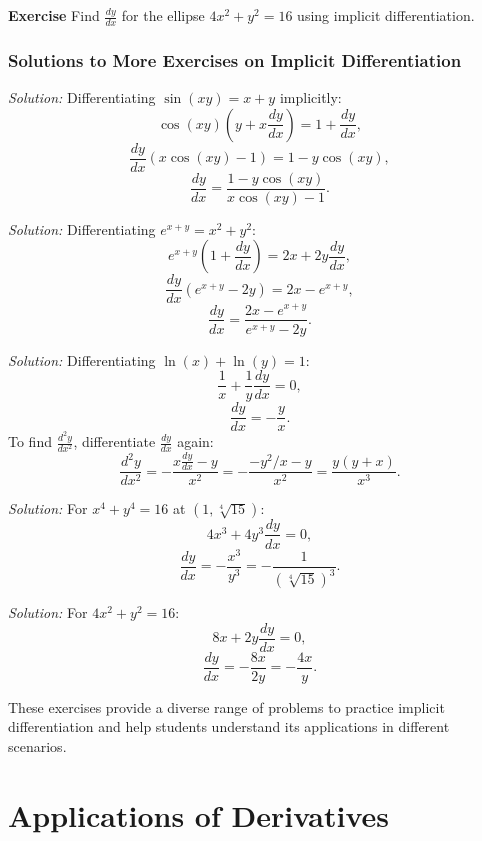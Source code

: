 \documentclass[a4paper,12pt]{book}
\newenvironment{exercise}[1][]
  {\par\medskip\noindent\textbf{Exercise #1} \rmfamily}
  {\medskip}
\newcounter{problem}
\newenvironment{solution}[1][]
{\par\noindent\textit{Solution:} \rmfamily}{\medskip}
\begin{document}
\begin{exercise}
Find \( \frac{dy}{dx} \) for the ellipse \( 4x^2 + y^2 = 16 \) using implicit differentiation.
\end{exercise}

\subsubsection*{Solutions to More Exercises on Implicit Differentiation}

\begin{solution}[to Exercise 1]
Differentiating \( \sin(xy) = x + y \) implicitly:
\[ \cos(xy)(y + x\frac{dy}{dx}) = 1 + \frac{dy}{dx}, \]
\[ \frac{dy}{dx}(x\cos(xy) - 1) = 1 - y\cos(xy), \]
\[ \frac{dy}{dx} = \frac{1 - y\cos(xy)}{x\cos(xy) - 1}. \]
\end{solution}

\begin{solution}[to Exercise 2]
Differentiating \( e^{x+y} = x^2 + y^2 \):
\[ e^{x+y}(1 + \frac{dy}{dx}) = 2x + 2y\frac{dy}{dx}, \]
\[ \frac{dy}{dx}(e^{x+y} - 2y) = 2x - e^{x+y}, \]
\[ \frac{dy}{dx} = \frac{2x - e^{x+y}}{e^{x+y} - 2y}. \]
\end{solution}

\begin{solution}[to Exercise 3]
Differentiating \( \ln(x) + \ln(y) = 1 \):
\[ \frac{1}{x} + \frac{1}{y}\frac{dy}{dx} = 0, \]
\[ \frac{dy}{dx} = -\frac{y}{x}. \]
To find \( \frac{d^2y}{dx^2} \), differentiate \( \frac{dy}{dx} \) again:
\[ \frac{d^2y}{dx^2} = -\frac{x\frac{dy}{dx} - y}{x^2} = -\frac{-y^2/x - y}{x^2} = \frac{y(y + x)}{x^3}. \]
\end{solution}

\begin{solution}[to Exercise 4]
For \( x^4 + y^4 = 16 \) at \( (1, \sqrt[4]{15}) \):
\[ 4x^3 + 4y^3\frac{dy}{dx} = 0, \]
\[ \frac{dy}{dx} = -\frac{x^3}{y^3} = -\frac{1}{(\sqrt[4]{15})^3}. \]
\end{solution}

\begin{solution}[to Exercise 5]
For \( 4x^2 + y^2 = 16 \):
\[ 8x + 2y\frac{dy}{dx} = 0, \]
\[ \frac{dy}{dx} = -\frac{8x}{2y} = -\frac{4x}{y}. \]
\end{solution}

These exercises provide a diverse range of problems to practice implicit differentiation and help students understand its applications in different scenarios.

\section{Applications of Derivatives}
\end{document}

